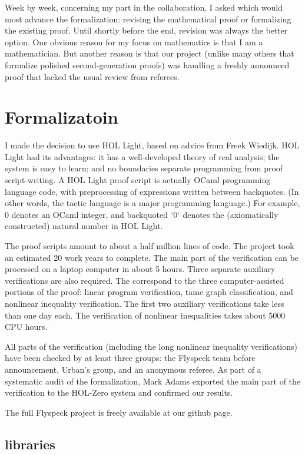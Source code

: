 \documentclass{amsart}
\begin{document}
Week by week, concerning my part in the collaboration, I asked which
would most advance the formalization: revising the mathematical proof
or formalizing the existing proof.  Until shortly before the end,
revision was always the better option.  One obvious reason for my
focus on mathematics is that I am a mathematician.  But another reason
is that our project (unlike many others that formalize polished
second-generation proofs) was handling a freshly announced proof that
lacked the usual review from referees.

\section{Formalizatoin}


I made the decision to use HOL Light, based on advice from Freek
Wiedijk.  HOL Light had its advantages: it has a well-developed theory
of real analysis; the system is easy to learn; and no boundaries
separate programming from proof script-writing.  A HOL Light proof
script is actually OCaml programming language code, with preprocessing
of expressions written between backquotes.  (In other words, the
tactic language is a major programming language.)  For example, $0$
denotes an OCaml integer, and backquoted $`0`$ denotes the
(axiomatically constructed) natural number in HOL Light.


The proof scripts amount to about a half million lines of code.
The project took an estimated 20 work years to complete.
The main part of the verification can be processed on a laptop computer
in about 5 hours.  Three separate auxiliary verifications are also
required. The correspond to the three computer-assisted portions of the
proof: linear program verification, tame graph classification, and
nonlinear inequality verification.  The first two auxiliary verifications
take less than one day each.  The verification of nonlinear inequalities
takes about 5000 CPU hours.

All parts of the verification (including the long nonlinear inequality
verifications) have been checked by at least three groups:
the Flyspeck team before announcement, Urban's group, and an anonymous
referee.  As part of a systematic audit of the formalization,
Mark Adams exported the main part of the verification to the HOL-Zero
system and confirmed our results.

The full Flyspeck project is freely available at our github page.  



\subsection{libraries}
\end{document}
